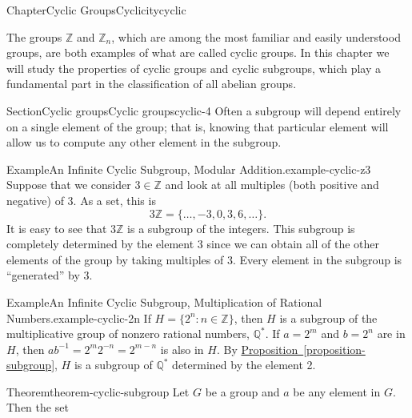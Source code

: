 \documentclass[oneside,10pt,]{book}
\newcommand{\xreffont}{\relax}
\numberwithin{equation}{section}
\begin{document}
\begin{chapterptx}{Chapter}{Cyclic Groups}{}{Cyclicity}{}{}{cyclic}
\renewcommand*{\chaptername}{Chapter}
\begin{introduction}{}%
The groups \(\mathbb Z\) and \({\mathbb Z}_n\), which are among the most familiar and easily understood groups, are both examples of what are called cyclic groups.  In this chapter we will study the properties of cyclic groups and cyclic subgroups, which play a fundamental part in the classification of all abelian groups.%
\end{introduction}%
%
%
\typeout{************************************************}
\typeout{************************************************}
%
\begin{sectionptx}{Section}{Cyclic groups}{}{Cyclic groups}{}{}{cyclic-4}
Often a subgroup will depend entirely on a single element of the group; that is, knowing that particular element will allow us to compute any other element in the subgroup.%
\begin{example}{Example}{An Infinite Cyclic Subgroup, Modular Addition.}{example-cyclic-z3}%
Suppose that we consider \(3 \in {\mathbb Z}\) and look at all multiples (both positive and negative) of 3.  As a set, this is%
\begin{equation*}
3 {\mathbb Z} = \{ \ldots, -3, 0, 3, 6, \ldots \}\text{.}
\end{equation*}
It is easy to see that \(3 {\mathbb Z}\) is a subgroup of the integers.  This subgroup is completely determined by the element 3 since we can obtain all of the other elements of the group by taking multiples of 3.  Every element in the subgroup is ``generated'' by 3.%
\end{example}
\begin{example}{Example}{An Infinite Cyclic Subgroup, Multiplication of Rational Numbers.}{example-cyclic-2n}%
If \(H = \{ 2^n : n \in {\mathbb Z} \}\), then \(H\) is a subgroup of the multiplicative group of nonzero rational numbers, \({\mathbb Q}^*\).  If \(a = 2^m\) and \(b = 2^n\) are in \(H\), then \(ab^{-1} = 2^m 2^{-n} = 2^{m-n}\) is also in \(H\).  By \hyperref[proposition-subgroup]{Proposition~{\xreffont\ref{proposition-subgroup}}}, \(H\) is a subgroup of \({\mathbb Q}^*\) determined by the element 2.%
\end{example}
\begin{theorem}{Theorem}{}{}{theorem-cyclic-subgroup}%
Let \(G\) be a group and \(a\) be any element in \(G\).  Then the set%
\begin{equation*}

\end{equation*}
\end{theorem}
\end{sectionptx}
\end{chapterptx}
\end{document}
